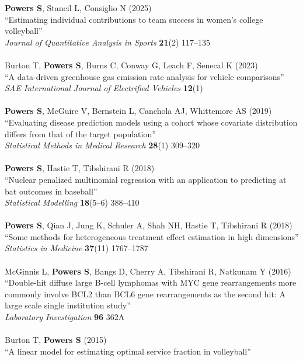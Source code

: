 \documentclass{article}
\begin{document}
{\bf Powers S}, Stancil L, Consiglio N (2025)\\
``Estimating individual contributions to team success in women's college volleyball''\\
{\it Journal of Quantitative Analysis in Sports} {\bf 21}(2) 117--135\\
~\\
Burton T, {\bf Powers S}, Burns C, Conway G, Leach F, Senecal K (2023)\\
``A data-driven greenhouse gas emission rate analysis for vehicle comparisons''\\
{\it SAE International Journal of Electrified Vehicles} {\bf 12}(1)\\
~\\
{\bf Powers S}, McGuire V, Bernstein L, Canchola AJ, Whittemore AS (2019)\\
``Evaluating disease prediction models using a cohort whose covariate distribution differs from that of the target population''\\
{\it Statistical Methods in Medical Research} {\bf 28}(1) 309--320\\
~\\
{\bf Powers S}, Hastie T, Tibshirani R (2018)\\
``Nuclear penalized multinomial regression with an application to predicting at bat outcomes in baseball''\\
{\it Statistical Modelling} {\bf 18}(5--6) 388--410\\
~\\
{\bf Powers S}, Qian J, Jung K, Schuler A, Shah NH, Hastie T, Tibshirani R (2018)\\
``Some methods for heterogeneous treatment effect estimation in high dimensions''\\
{\it Statistics in Medicine} {\bf 37}(11) 1767--1787\\
~\\
McGinnis L, {\bf Powers S}, Bangs D, Cherry A, Tibshirani R, Natkunam Y (2016)\\
``Double-hit diffuse large B-cell lymphomas with MYC gene rearrangements more commonly involve BCL2 than BCL6 gene rearrangements as the second hit: A large scale single institution study''\\
{\it Laboratory Investigation} {\bf 96} 362A\\
~\\
Burton T, {\bf Powers S} (2015)\\
``A linear model for estimating optimal service fraction in volleyball''\\
\end{document}

